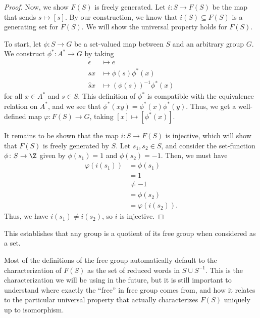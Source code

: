 \begin{proof}
  Now, we show $F(S)$ is freely generated. Let $i\colon S\rightarrow F(S)$ be the map that sends $s\mapsto \left[s\right]$. By our construction, we know that $i(S)\subseteq F(S)$ is a generating set for $F(S)$. We will show the universal property holds for $F(S)$.\newline

  To start, let $\phi\colon S\rightarrow G$ be a set-valued map between $S$ and an arbitrary group $G$. We construct $\phi^{\ast}\colon A^{\ast}\rightarrow G$ by taking
  \begin{align*}
    \epsilon &\mapsto e\\
    sx &\mapsto \phi(s)\phi^{\ast}\left(x\right)\\
    \hat{s}x &\mapsto \left(\phi(s)\right)^{-1}\phi^{\ast}\left(x\right)
  \end{align*}
  for all $x\in A^{\ast}$ and $s\in S$. This definition of $\phi^{\ast}$ is compatible with the equivalence relation on $A^{\ast}$, and we see that $\phi^{\ast}\left(xy\right) = \phi^{\ast}\left(x\right)\phi^{\ast}\left(y\right)$. Thus, we get a well-defined map $\varphi\colon F(S)\rightarrow G$, taking $\left[x\right]\mapsto \left[\phi^{\ast}\left(x\right)\right]$.\newline

  It remains to be shown that the map $i\colon S\rightarrow F(S)$ is injective, which will show that $F(S)$ is freely generated by $S$. Let $s_1,s_2\in S$, and consider the set-function $\phi\colon S\rightarrow \Z$ given by $\phi\left(s_1\right) = 1$ and $\phi\left(s_2\right) = -1$. Then, we must have
  \begin{align*}
    \varphi\left(i\left(s_1\right)\right) &= \phi\left(s_1\right)\\
                                          &= 1\\
                                          &\neq -1\\
                                          &= \phi\left(s_2\right)\\
                                          &= \varphi\left(i\left(s_2\right)\right).
  \end{align*}
  Thus, we have $i\left(s_1\right)\neq i\left(s_2\right)$, so $i$ is injective.
\end{proof}
\begin{remark}
  This establishes that any group is a quotient of its free group when considered as a set.
\end{remark}

Most of the definitions of the free group automatically default to the characterization of $F(S)$ as the set of reduced words in $S\cup S^{-1}$. This is the characterization we will be using in the future, but it is still important to understand where exactly the ``free'' in free group comes from, and how it relates to the particular universal property that actually characterizes $F(S)$ uniquely up to isomorphism.

